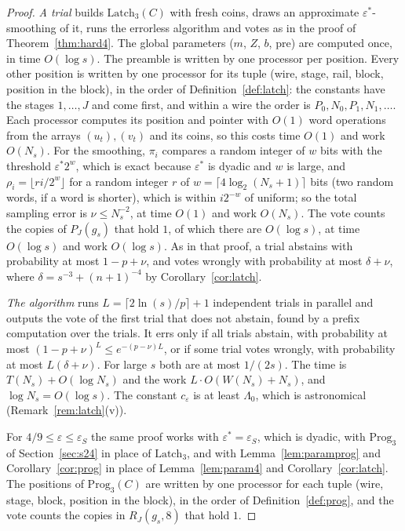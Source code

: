 \documentclass[11pt]{amsart}
\theoremstyle{definition}
\theoremstyle{remark}
\newcommand{\eps}{\varepsilon}
\begin{document}
\begin{proof}
\emph{A trial} builds $\mathrm{Latch}_3(C)$ with fresh coins, draws an approximate
$\eps^*$-smoothing of it, runs the errorless algorithm and votes as in the proof of
Theorem~\ref{thm:hard4}. The global parameters ($m$, $Z$, $b$, $\mathrm{pre}$) are computed once,
in time $O(\log s)$. The preamble is written by one processor per position. Every other position is
written by one processor for its tuple (wire, stage, rail, block, position in the block), in the
order of Definition~\ref{def:latch}: the constants have the stages $1,\dots,J$ and come first, and
within a wire the order is $P_0,N_0,P_1,N_1,\dots$. Each processor computes its position and
pointer with $O(1)$ word operations from the arrays $(u_t),(v_t)$ and its coins, so this costs
time $O(1)$ and work $O(N_s)$. For the smoothing, $\pi_i$ compares a random integer of $w$ bits with
the threshold $\eps^*2^w$, which is exact because $\eps^*$ is dyadic and $w$ is large, and
$\rho_i=\lfloor ri/2^w\rfloor$ for a random integer $r$ of $w=\lceil 4\log_2(N_s+1)\rceil$ bits
(two random words, if a word is shorter), which is within $i2^{-w}$ of uniform; so the total
sampling error is $\nu\le N_s^{-2}$, at time $O(1)$ and work $O(N_s)$. The vote counts the copies of
$P_J(g_s)$ that hold $1$, of which there are $O(\log s)$, at time $O(\log s)$ and work $O(\log s)$.
As in that proof, a trial abstains with probability at most $1-p+\nu$, and votes wrongly with
probability at most $\delta+\nu$, where $\delta=s^{-3}+(n+1)^{-4}$ by Corollary~\ref{cor:latch}.

\emph{The algorithm} runs $L=\lceil2\ln(s)/p\rceil+1$ independent trials in parallel and outputs
the vote of the first trial that does not abstain, found by a prefix computation over the trials.
It errs only if all trials abstain, with probability at most $(1-p+\nu)^L\le e^{-(p-\nu)L}$, or
if some trial votes wrongly, with probability at most $L(\delta+\nu)$. For large $s$ both are at
most $1/(2s)$. The time is $T(N_s)+O(\log N_s)$ and the work
$L\cdot O(W(N_s)+N_s)$, and $\log N_s=O(\log s)$. The constant $c_\eps$ is at least $\Lambda_0$,
which is astronomical (Remark~\ref{rem:latch}(v)).

For $4/9\le\eps\le\eps_S$ the same proof works with $\eps^*=\eps_S$, which is dyadic, with
$\mathrm{Prog}_3$ of Section~\ref{sec:s24} in place of $\mathrm{Latch}_3$, and with
Lemma~\ref{lem:paramprog} and Corollary~\ref{cor:prog} in place of Lemma~\ref{lem:param4} and
Corollary~\ref{cor:latch}. The positions of $\mathrm{Prog}_3(C)$ are written by one processor for
each tuple (wire, stage, block, position in the block), in the order of Definition~\ref{def:prog},
and the vote counts the copies in $R_J(g_s,8)$ that hold $1$.
\end{proof}
\end{document}
